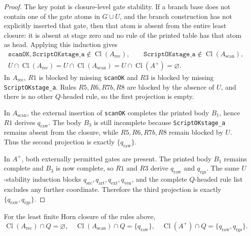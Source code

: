 \documentclass[runningheads]{llncs}
\newcommand{\rawBeginTokenCoord}{q_{\mathrm{raw}}}
\newcommand{\qlex}{\rawBeginTokenCoord}
\newcommand{\qrgs}{q_{\mathrm{rgs}}}
\newcommand{\qsrc}{q_{\mathrm{src}}}
\newcommand{\qart}{q_{\mathrm{art}}}
\newcommand{\qext}{q_{\mathrm{ext}}}
\newcommand{\qven}{q_{\mathrm{ven}}}
\begin{document}
\begin{proof}
The key point is closure-level gate stability.  If a branch base does not
contain one of the gate atoms in \(G\cup U\), and the branch construction has
not explicitly inserted that gate, then that atom is absent from the entire
least closure: it is absent at stage zero and no rule of the printed table has
that atom as head.  Applying this induction gives
\[
\begin{gathered}
\texttt{scanOK},\texttt{ScriptOKstage\_a}\notin
\operatorname{Cl}(A_{\mathrm{rec}}),\qquad
\texttt{ScriptOKstage\_a}\notin
\operatorname{Cl}(A_{\mathrm{scan}}),\\
U\cap\operatorname{Cl}(A_{\mathrm{rec}})
=U\cap\operatorname{Cl}(A_{\mathrm{scan}})
=U\cap\operatorname{Cl}(A^{+})=\varnothing .
\end{gathered}
\]
In \(A_{\mathrm{rec}}\), \(R1\) is blocked by missing \texttt{scanOK} and
\(R3\) is blocked by missing \texttt{ScriptOKstage\_a}.  Rules \(R5,R6,R7b,R8\)
are blocked by the absence of \(U\), and there is no other \(Q\)-headed rule, so
the first projection is empty.

In \(A_{\mathrm{scan}}\), the external insertion of \texttt{scanOK} completes
the printed body \(B_1\), hence \(R1\) derives \(\qlex\).  The body \(B_3\) is
still incomplete because \texttt{ScriptOKstage\_a} remains absent from the
closure, while \(R5,R6,R7b,R8\) remain blocked by \(U\).  Thus the second
projection is exactly \(\{\qlex\}\).

In \(A^{+}\), both externally permitted gates are present.  The printed body
\(B_1\) remains complete and \(B_3\) is now complete, so \(R1\) and \(R3\)
derive \(\qlex\) and \(\qrgs\).  The same \(U\)-stability induction blocks
\(\qsrc,\qart,\qext,\qven\), and the complete \(Q\)-headed rule list excludes
any further coordinate.  Therefore the third projection is exactly
\(\{\qlex,\qrgs\}\).
\end{proof}

\begin{proposition}
\label{prop:printed-horn-calculation-main}
For the least finite Horn closure of the rules above,
\[
\operatorname{Cl}(A_{\mathrm{rec}})\cap Q=\varnothing,\quad
\operatorname{Cl}(A_{\mathrm{scan}})\cap Q=\{\qlex\},\quad
\operatorname{Cl}(A^{+})\cap Q=\{\qlex,\qrgs\}.
\]
\end{proposition}
\end{document}

